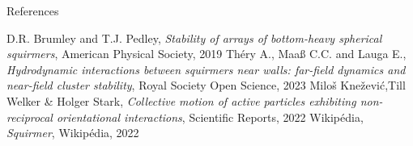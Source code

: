 \documentclass{beamer}
\begin{document}
\begin{frame}{References}
    \begin{thebibliography}{}
         D.R. Brumley and T.J. Pedley, \emph{Stability of arrays of bottom-heavy spherical squirmers}, American Physical Society, 2019
         Théry A., Maaß C.C. and Lauga E., \emph{Hydrodynamic interactions between squirmers near walls: far-field dynamics and near-field cluster stability}, Royal Society Open Science, 2023
         Miloš Knežević,Till Welker \& Holger Stark, \emph{Collective motion of active particles exhibiting non-reciprocal orientational interactions}, Scientific Reports, 2022
         Wikipédia, \emph{Squirmer}, Wikipédia, 2022
    \end{thebibliography}
\end{frame}
\end{document}
